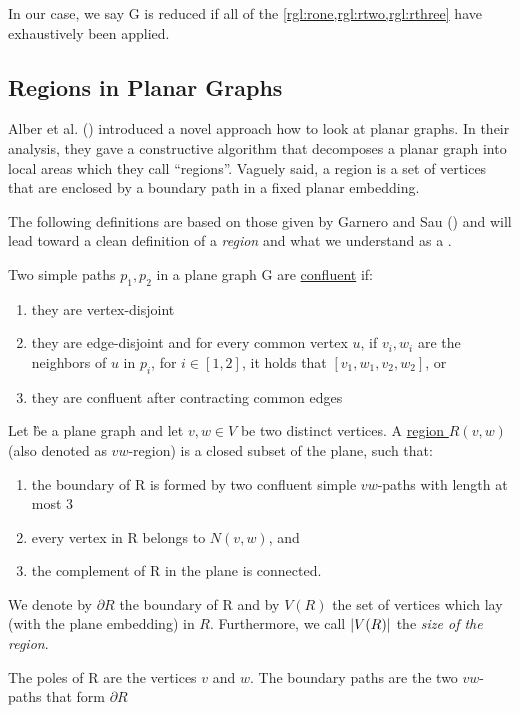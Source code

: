 In our case, we say G is reduced if all of the \cref{rgl:rone,rgl:rtwo,rgl:rthree} have exhaustively been applied.

\subsection{Regions in Planar Graphs}

Alber et al. (\cite{Alber2004}) introduced a novel approach how to look at planar graphs. In their analysis, they gave a constructive algorithm that decomposes a planar graph into local areas which they call ``regions''. Vaguely said, a region is a set of vertices that are enclosed by a boundary path in a fixed planar embedding.

The following definitions are based on those given by Garnero and Sau (\cite{Garnero2014}) and will lead toward a clean definition of a \textit{region} and what we understand as a \dreg.

\begin{definition}
    Two simple paths $p_1, p_2$ in a plane graph G are \underline{confluent} if:
    
    \begin{enumerate}
        \item they are vertex-disjoint
        \item they are edge-disjoint and for every common vertex $u$, if $v_i, w_i$ are the neighbors of $u$ in $p_i$, for $i \in [1,2]$, it holds that $[v_1, w_1, v_2, w_2]$, or
        \item they are confluent after contracting common edges
    \end{enumerate}
\end{definition}


\begin{definition}
    Let \G be a plane graph and let $v,w \in V$ be two distinct vertices. A \underline{ region $R(v,w)$} (also denoted as $vw$-region) is a closed subset of the plane, such that:
    \begin{enumerate}
        \item the boundary of R is formed by two confluent simple $vw$-paths with length at most 3
        \item every vertex in R belongs to $N(v,w)$, and
        \item the complement of R in the plane is connected.
    \end{enumerate}
    
    We denote by $\partial R$ the boundary of R and by $V(R)$ the set of vertices which lay (with the plane embedding) in $R$. Furthermore, we call $\abs{V(R)}$ the \textit{size of the region}.
    
    The poles of R are the vertices $v$ and $w$. The boundary paths are the two $vw$-paths that form $\partial R$
    
\end{definition}


